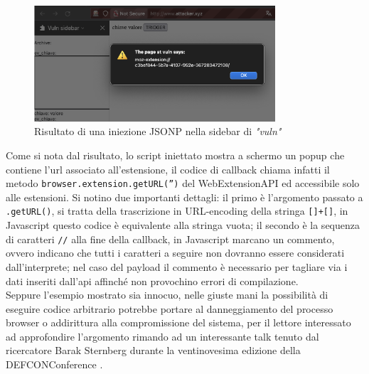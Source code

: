 \documentclass{sapthesis}
\newcommand{\code}[1]{\texttt{#1}}
\newcommand{\method}[1]{\code{.#1()}}
\newcommand{\vuln}{\textit{"vuln"}}
\newcommand{\JS}{Javascript}
\begin{document}
                \begin{figure}[ht]
                    \centering
                    \includegraphics[width=0.8\textwidth]{sidebar-jsonp-injection.png}
                    \caption{Risultato di una iniezione JSONP nella sidebar di \vuln{}}
                    \label{fig:sidebar-jsonp-injection}
                \end{figure}

                Come si nota dal risultato, lo script iniettato mostra a schermo un popup
                che contiene l'url associato all'estensione, il codice di callback chiama
                infatti il metodo \code{browser.extension.getURL('')} del WebExtensionAPI
                ed accessibile solo alle estensioni. Si notino due importanti dettagli:
                il primo è l'argomento passato a \method{getURL}, si tratta della trascrizione
                in URL-encoding della stringa \code{[]+[]}, in \JS{} questo codice è equivalente
                alla stringa vuota; il secondo è la sequenza di caratteri \code{//} alla fine della
                callback, in \JS{} marcano un commento, ovvero indicano che tutti i caratteri
                a seguire non dovranno essere considerati dall'interprete; nel caso del payload
                il commento è necessario per tagliare via i dati inseriti dall'api affinché
                non provochino errori di compilazione.\\

                Seppure l'esempio mostrato sia innocuo, nelle giuste mani la possibilità di
                eseguire codice arbitrario potrebbe portare al danneggiamento del processo
                browser o addirittura alla compromissione del sistema, per il lettore interessato
                ad approfondire l'argomento rimando ad un interessante talk tenuto dal ricercatore
                Barak Sternberg durante la ventinovesima edizione della DEFCONConference \cite{barak-sternberg-browser-extensions}.
\end{document}
